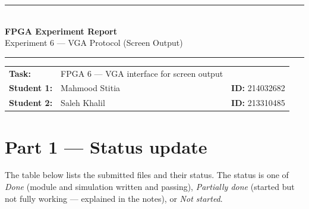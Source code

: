 \documentclass[11pt,a4paper]{article}
\begin{document}
\thispagestyle{fancy}
\begin{center}
  {\color{accent}\rule{\linewidth}{1.4pt}}\\[10pt]
  {\fontsize{24}{28}\selectfont \textbf{\color{accent}FPGA Experiment Report}}\\[6pt]
  {\large Experiment 6 --- VGA Protocol (Screen Output)}\\[8pt]
  {\color{accent}\rule{\linewidth}{1.4pt}}
\end{center}

\vspace{6pt}

\renewcommand{\arraystretch}{1.3}
\begin{center}
\begin{tabular}{@{}l l l@{}}
\textbf{Task:} & FPGA 6 --- VGA interface for screen output & \\
\textbf{Student 1:} & Mahmood Stitia & \textbf{ID:} 214032682 \\
\textbf{Student 2:} & Saleh Khalil  & \textbf{ID:} 213310485 \\
\end{tabular}
\end{center}

\vspace{6pt}

\section*{Part 1 --- Status update}

The table below lists the submitted files and their status. The status is one of
\emph{Done} (module and simulation written and passing), \emph{Partially done}
(started but not fully working --- explained in the notes), or \emph{Not started}.
\end{document}
